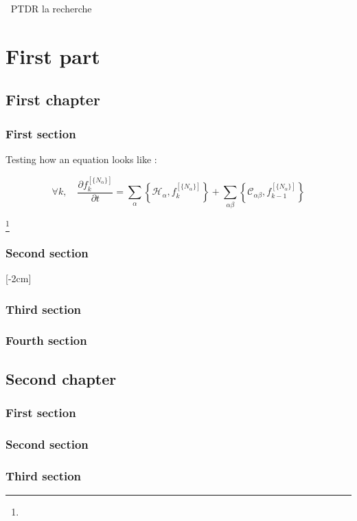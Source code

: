 \documentclass{researchbook}
\theoremstyle{plain}
\theoremstyle{definition}
\theoremstyle{remark}
\begin{document}
\newpage
$~$
\vskip 3cm 
\hskip 2cm PTDR la recherche
\tableofcontents


\part{First part}
\chapter{First chapter}

\section{First section}

Testing how an equation looks like : 

\[
\forall k, \quad \frac{\partial f^{[\{N_\alpha\}]}_{k}}{\partial t} = \sum_\alpha\left\{\mathcal{H}_\alpha, f^{[\{N_\alpha\}]}_k\right\} + \sum_{\alpha\beta} \left\{\mathcal{C}_{\alpha\beta}, f^{[\{N_\alpha\}]}_{k-1}\right\}
\]
\lipsum

\footnote{\lipsum}

\section{Second section}\lipsum
\reversemarginpar{}[-2cm]
\section{Third section}\lipsum
\section{Fourth section}\lipsum

\chapter{Second chapter}

\section{First section}\lipsum
\section{Second section}\lipsum
\section{Third section}\lipsum
\end{document}
